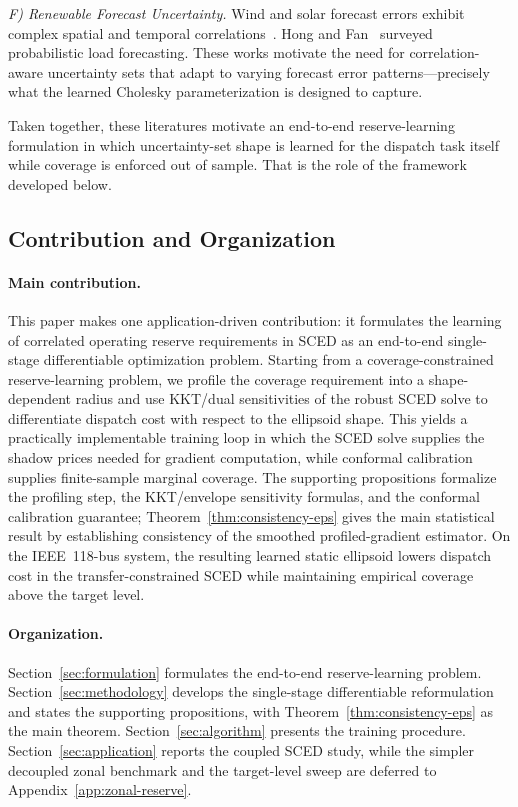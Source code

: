 \documentclass[11pt]{article}
\theoremstyle{definition}
\begin{document}
\emph{F) Renewable Forecast Uncertainty.}
Wind and solar forecast errors exhibit complex spatial and temporal correlations~\citep{hodge2011wind,pinson2013wind}. Hong and Fan~\citep{hong2016probabilistic} surveyed probabilistic load forecasting. These works motivate the need for correlation-aware uncertainty sets that adapt to varying forecast error patterns---precisely what the learned Cholesky parameterization is designed to capture.

Taken together, these literatures motivate an end-to-end reserve-learning formulation in which uncertainty-set shape is learned for the dispatch task itself while coverage is enforced out of sample. That is the role of the framework developed below.

\subsection{Contribution and Organization}

\paragraph{Main contribution.}
This paper makes one application-driven contribution: it formulates the learning of correlated operating reserve requirements in SCED as an end-to-end single-stage differentiable optimization problem. Starting from a coverage-constrained reserve-learning problem, we profile the coverage requirement into a shape-dependent radius and use KKT/dual sensitivities of the robust SCED solve to differentiate dispatch cost with respect to the ellipsoid shape. This yields a practically implementable training loop in which the SCED solve supplies the shadow prices needed for gradient computation, while conformal calibration supplies finite-sample marginal coverage. The supporting propositions formalize the profiling step, the KKT/envelope sensitivity formulas, and the conformal calibration guarantee; Theorem~\ref{thm:consistency-eps} gives the main statistical result by establishing consistency of the smoothed profiled-gradient estimator. On the IEEE~118-bus system, the resulting learned static ellipsoid lowers dispatch cost in the transfer-constrained SCED while maintaining empirical coverage above the target level.

\paragraph{Organization.}
Section~\ref{sec:formulation} formulates the end-to-end reserve-learning problem. Section~\ref{sec:methodology} develops the single-stage differentiable reformulation and states the supporting propositions, with Theorem~\ref{thm:consistency-eps} as the main theorem. Section~\ref{sec:algorithm} presents the training procedure. Section~\ref{sec:application} reports the coupled SCED study, while the simpler decoupled zonal benchmark and the target-level sweep are deferred to Appendix~\ref{app:zonal-reserve}.
\end{document}

